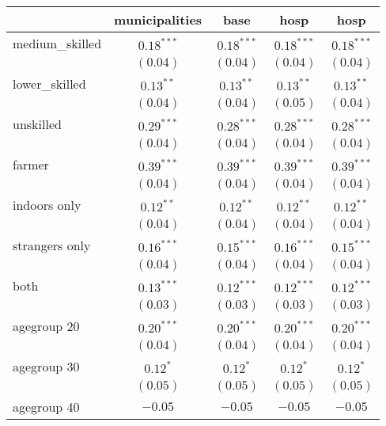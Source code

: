 
\begin{table}
\begin{center}
\begin{tabular}{l c c c c}
\hline
 & municipalities & base & hosp & hosp \\
\hline
medium\_skilled      & $0.18^{***}$  & $0.18^{***}$  & $0.18^{***}$  & $0.18^{***}$  \\
                     & $(0.04)$      & $(0.04)$      & $(0.04)$      & $(0.04)$      \\
lower\_skilled       & $0.13^{**}$   & $0.13^{**}$   & $0.13^{**}$   & $0.13^{**}$   \\
                     & $(0.04)$      & $(0.04)$      & $(0.05)$      & $(0.04)$      \\
unskilled            & $0.29^{***}$  & $0.28^{***}$  & $0.28^{***}$  & $0.28^{***}$  \\
                     & $(0.04)$      & $(0.04)$      & $(0.04)$      & $(0.04)$      \\
farmer               & $0.39^{***}$  & $0.39^{***}$  & $0.39^{***}$  & $0.39^{***}$  \\
                     & $(0.04)$      & $(0.04)$      & $(0.04)$      & $(0.04)$      \\
indoors only         & $0.12^{**}$   & $0.12^{**}$   & $0.12^{**}$   & $0.12^{**}$   \\
                     & $(0.04)$      & $(0.04)$      & $(0.04)$      & $(0.04)$      \\
strangers only       & $0.16^{***}$  & $0.15^{***}$  & $0.16^{***}$  & $0.15^{***}$  \\
                     & $(0.04)$      & $(0.04)$      & $(0.04)$      & $(0.04)$      \\
both                 & $0.13^{***}$  & $0.12^{***}$  & $0.12^{***}$  & $0.12^{***}$  \\
                     & $(0.03)$      & $(0.03)$      & $(0.03)$      & $(0.03)$      \\
agegroup 20          & $0.20^{***}$  & $0.20^{***}$  & $0.20^{***}$  & $0.20^{***}$  \\
                     & $(0.04)$      & $(0.04)$      & $(0.04)$      & $(0.04)$      \\
agegroup 30          & $0.12^{*}$    & $0.12^{*}$    & $0.12^{*}$    & $0.12^{*}$    \\
                     & $(0.05)$      & $(0.05)$      & $(0.05)$      & $(0.05)$      \\
agegroup 40          & $-0.05$       & $-0.05$       & $-0.05$       & $-0.05$       \\

\end{tabular}
\end{center}
\end{table}
